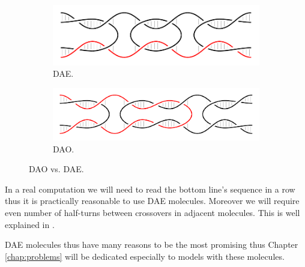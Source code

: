 		\begin{figure}[h]
		\begin{center}
			\begin{subfigure}[b]{0.433\textwidth} %
				\includegraphics[width=\textwidth]{./figures/dao-dae/dae.pdf}
				\caption{DAE.}
				\label{fig:dao}
			\end{subfigure}
			\begin{subfigure}[b]{0.5\textwidth} %
				\includegraphics[width=\textwidth]{./figures/dao-dae/dao.pdf}
				\caption{DAO.}
				\label{fig:dae}
			\end{subfigure}
			\caption{DAO vs. DAE.}
			\label{fig:dao-dae}
		\end{center}
		\end{figure}
		
		In a real computation we will need to read the bottom line's sequence in a row thus it is practically reasonable to use DAE molecules. Moreover we will require even number of half-turns between crossovers in adjacent molecules. This is well explained in \cite[p.37]{winfree_phd}.
		
		DAE molecules thus have many reasons to be the most promising %
		thus Chapter \ref{chap:problems} will be dedicated especially to models with these molecules.